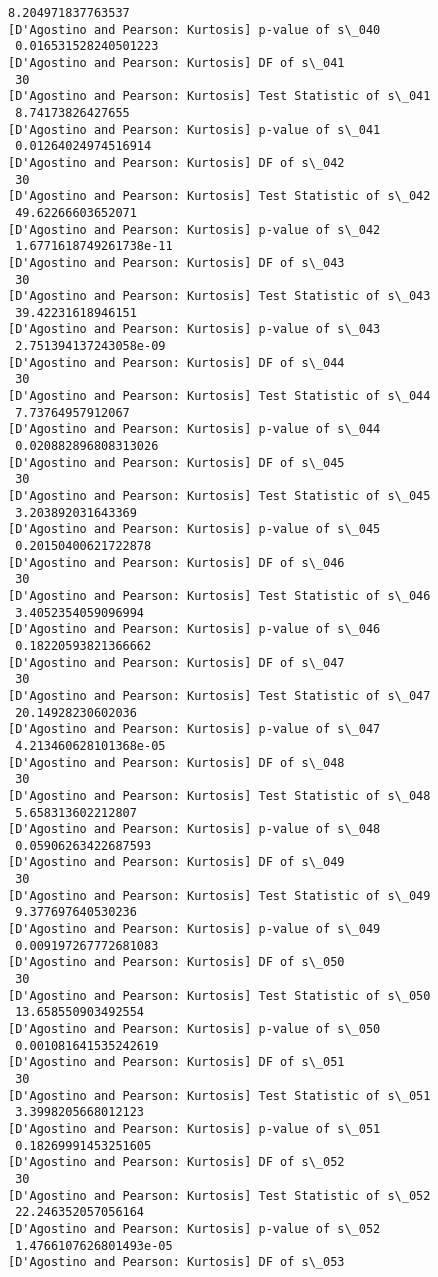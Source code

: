 \documentclass[11pt]{article}
\begin{document}
\begin{Verbatim}[commandchars=\\\{\}]
 8.204971837763537
[D'Agostino and Pearson: Kurtosis] p-value of s\_040
 0.016531528240501223
[D'Agostino and Pearson: Kurtosis] DF of s\_041
 30
[D'Agostino and Pearson: Kurtosis] Test Statistic of s\_041
 8.74173826427655
[D'Agostino and Pearson: Kurtosis] p-value of s\_041
 0.01264024974516914
[D'Agostino and Pearson: Kurtosis] DF of s\_042
 30
[D'Agostino and Pearson: Kurtosis] Test Statistic of s\_042
 49.62266603652071
[D'Agostino and Pearson: Kurtosis] p-value of s\_042
 1.6771618749261738e-11
[D'Agostino and Pearson: Kurtosis] DF of s\_043
 30
[D'Agostino and Pearson: Kurtosis] Test Statistic of s\_043
 39.42231618946151
[D'Agostino and Pearson: Kurtosis] p-value of s\_043
 2.751394137243058e-09
[D'Agostino and Pearson: Kurtosis] DF of s\_044
 30
[D'Agostino and Pearson: Kurtosis] Test Statistic of s\_044
 7.73764957912067
[D'Agostino and Pearson: Kurtosis] p-value of s\_044
 0.020882896808313026
[D'Agostino and Pearson: Kurtosis] DF of s\_045
 30
[D'Agostino and Pearson: Kurtosis] Test Statistic of s\_045
 3.203892031643369
[D'Agostino and Pearson: Kurtosis] p-value of s\_045
 0.20150400621722878
[D'Agostino and Pearson: Kurtosis] DF of s\_046
 30
[D'Agostino and Pearson: Kurtosis] Test Statistic of s\_046
 3.4052354059096994
[D'Agostino and Pearson: Kurtosis] p-value of s\_046
 0.18220593821366662
[D'Agostino and Pearson: Kurtosis] DF of s\_047
 30
[D'Agostino and Pearson: Kurtosis] Test Statistic of s\_047
 20.14928230602036
[D'Agostino and Pearson: Kurtosis] p-value of s\_047
 4.213460628101368e-05
[D'Agostino and Pearson: Kurtosis] DF of s\_048
 30
[D'Agostino and Pearson: Kurtosis] Test Statistic of s\_048
 5.658313602212807
[D'Agostino and Pearson: Kurtosis] p-value of s\_048
 0.05906263422687593
[D'Agostino and Pearson: Kurtosis] DF of s\_049
 30
[D'Agostino and Pearson: Kurtosis] Test Statistic of s\_049
 9.377697640530236
[D'Agostino and Pearson: Kurtosis] p-value of s\_049
 0.009197267772681083
[D'Agostino and Pearson: Kurtosis] DF of s\_050
 30
[D'Agostino and Pearson: Kurtosis] Test Statistic of s\_050
 13.658550903492554
[D'Agostino and Pearson: Kurtosis] p-value of s\_050
 0.001081641535242619
[D'Agostino and Pearson: Kurtosis] DF of s\_051
 30
[D'Agostino and Pearson: Kurtosis] Test Statistic of s\_051
 3.3998205668012123
[D'Agostino and Pearson: Kurtosis] p-value of s\_051
 0.18269991453251605
[D'Agostino and Pearson: Kurtosis] DF of s\_052
 30
[D'Agostino and Pearson: Kurtosis] Test Statistic of s\_052
 22.246352057056164
[D'Agostino and Pearson: Kurtosis] p-value of s\_052
 1.4766107626801493e-05
[D'Agostino and Pearson: Kurtosis] DF of s\_053

\end{Verbatim}
\end{document}
